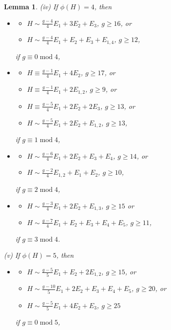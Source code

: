\documentclass[11pt]{amsart}
\newtheorem{lemma}[thm]{Lemma}
\theoremstyle{definition}
\begin{document}
\begin{lemma}
(iv) If $\phi(H)=4$, then 
\begin{itemize}
\item 
  \begin{itemize}
  \item [] $H \sim \frac{g-4}{4}E_1+3E_2+E_3$, $ g \geqslant 16$, or 
  \item [] $H \sim \frac{g-4}{4}E_1+E_2+E_3+E_{1,4}$, $ g \geqslant 12$,
  \end{itemize}
if $g \equiv 0 \; \mbox{mod} \; 4$,
\item  \begin{itemize}
\item [] $H \equiv \frac{g-1}{4}E_1+4E_2$, $g \geqslant 17$, or
\item [] $H \equiv \frac{g-1}{4}E_1+2E_{1,2}$, $g \geqslant 9$, or
\item []  $H \equiv \frac{g-5}{4}E_1+2E_{2}+2E_3$, $g \geqslant 13$, or
\item []  $H \sim \frac{g-5}{4}E_1+2E_{2}+E_{1,2}$, $g \geqslant 13$, 
\end{itemize}
if $g \equiv 1 \; \mbox{mod} \; 4$,
\item\begin{itemize}
\item []$H \sim \frac{g-6}{4}E_1+2E_{2}+E_3+E_4$, $g \geqslant 14$, or
\item []$H \sim  \frac{g-2}{4}  E_{1,2}+E_{1}+E_2$, $g \geqslant  10$,
\end{itemize}
if $g \equiv 2 \; \mbox{mod} \; 4$,
\item \begin{itemize}
\item  [] $H \sim \frac{g-3}{4}E_1+2E_2+E_{1,3}$,  $g \geqslant 15$   or
\item [] $H \sim \frac{g-7}{4}E_1+E_{2}+E_{3}+E_4+E_5$, $g \geqslant  11$, 
\end{itemize}
if $g \equiv 3 \; \mbox{mod} \; 4$.
\end{itemize}


(v) If $\phi(H)=5$, then
\begin{itemize}

\item
  \begin{itemize}
  \item []$H \sim \frac{g-5}{5}E_1+E_2+2E_{1,2}$, $ g \geqslant 15$, or 
\item []$H \sim \frac{g-10}{5}E_1+2E_2+E_3+E_4+E_5$, $ g \geqslant 20$, or 
\item []$H \sim \frac{g-5}{5}E_1+4E_2+E_3$, $ g \geqslant 25$
  \end{itemize}
if $g \equiv 0 \; \mbox{mod} \; 5$,


\end{itemize}
\end{lemma}
\end{document}
